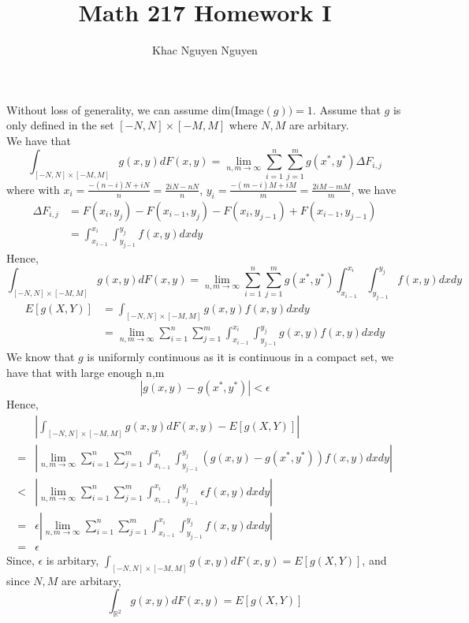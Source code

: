 \documentclass[11pt]{article}
\title{\textbf{Math 217 Homework I}}
\author{Khac Nguyen Nguyen}
\date{}
\begin{document}
\section{}
Without loss of generality, we can assume dim(Image$(g)) = 1$.
Assume that $g$ is only defined in the set $[-N,N] \times [-M,M]$ where $N,M$ are arbitary. \\
We have that 
\[
    \int_{[-N,N] \times [-M,M]} g(x,y) dF(x,y) = \lim_{n,m \to \infty} \sum_{i=1}^n \sum_{j=1}^m g(x^*, y^*) \Delta F_{i,j}
\]
where with $x_i = \frac{-(n-i)N + iN}{n} = \frac{2iN - nN}{n}$, $y_i = \frac{-(m-i)M + iM}{m} = \frac{2iM - mM}{m}$, we have
\begin{equation*}
    \begin{aligned}
        \Delta F_{i,j} &= F(x_i, y_j) - F(x_{i-1}, y_j) - F(x_i, y_{j-1}) + F(x_{i-1}, y_{j-1}) \\
        &= \int_{x_{i-1}}^{x_i} \int_{y_{j-1}}^{y_j} f(x,y) dxdy
    \end{aligned}
\end{equation*}
Hence, 
\[
    \int_{[-N,N] \times [-M,M]} g(x,y) dF(x,y) = \lim_{n,m \to \infty} \sum_{i=1}^n \sum_{j=1}^m g(x^*, y^*) \int_{x_{i-1}}^{x_i} \int_{y_{j-1}}^{y_j} f(x,y) dxdy
\]
\begin{equation*}
    \begin{aligned}
        E[g(X,Y)] &= \int_{[-N,N] \times [-M,M]} g(x,y) f(x,y) dxdy \\
        &=  \lim_{n,m \to \infty} \sum_{i=1}^n \sum_{j=1}^m \int_{x_{i-1}}^{x_i} \int_{y_{j-1}}^{y_j} g(x, y) f(x,y) dxdy 
    \end{aligned}
\end{equation*}
We know that $g$ is uniformly continuous as it is continuous in a compact set, we have that with large enough n,m
\[
    | g(x,y) - g(x^*, y^*) | < \epsilon
\]
Hence, 
\begin{equation*}
    \begin{aligned}
        & \left| \int_{[-N,N] \times [-M,M]} g(x,y) dF(x,y)  - E[g(X,Y)] \right| \\
        =&  \left| \lim_{n,m \to \infty} \sum_{i=1}^n \sum_{j=1}^m  \int_{x_{i-1}}^{x_i} \int_{y_{j-1}}^{y_j} (g(x, y) - g(x^*,y^*)) f(x,y)  dxdy \right| \\
        <& \left| \lim_{n,m \to \infty} \sum_{i=1}^n \sum_{j=1}^m  \int_{x_{i-1}}^{x_i} \int_{y_{j-1}}^{y_j} \epsilon f(x,y)  dxdy \right| \\
        =& \epsilon \left|\lim_{n,m \to \infty} \sum_{i=1}^n \sum_{j=1}^m  \int_{x_{i-1}}^{x_i} \int_{y_{j-1}}^{y_j} f(x,y)  dxdy \right| \\
        =& \epsilon
    \end{aligned}
\end{equation*}
Since, $\epsilon$ is arbitary, $\int_{[-N,N] \times [-M,M]} g(x,y) dF(x,y)  = E[g(X,Y)]$, and since $N,M$ are arbitary,
\[
    \int_{\mathbb{R}^2} g(x,y) dF(x,y)  = E[g(X,Y)]
\]
\pagebreak
\end{document}
